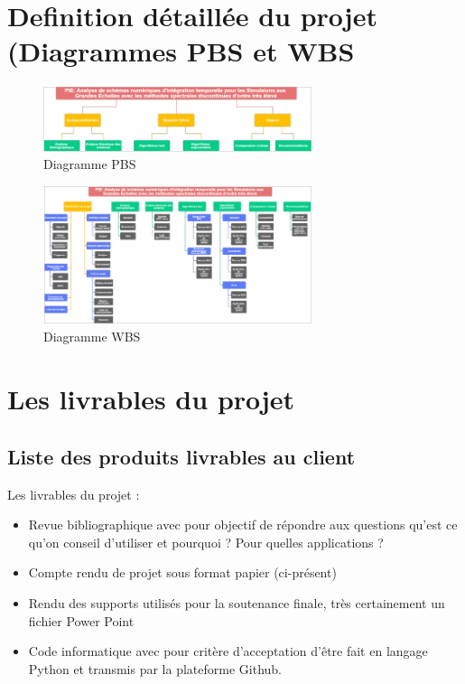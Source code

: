 \documentclass[a4paper,12pt]{report}
\theoremstyle{break}
\begin{document}
\chapter{Definition détaillée du projet (Diagrammes PBS et WBS}

\begin{figure}
     \centering
      \includegraphics[width=0.7\textwidth]{images/PBS.png}
       \caption{Diagramme PBS}
    \label{chaine optim}
\end{figure}
    
  \begin{figure}
     \centering
       \includegraphics[width=0.7\textwidth]{images/WBS.png}
       \caption{Diagramme WBS}
     \label{chaine optim}
  \end{figure}
    
\chapter{Les livrables du projet}
\section{Liste des produits livrables au client}
   Les livrables du projet :
   \begin{itemize}[label=\textbullet]
   	\item Revue bibliographique avec pour objectif de répondre aux questions qu’est ce qu’on conseil d’utiliser et pourquoi ? Pour quelles applications ?
   	\item Compte rendu de projet sous format papier (ci-présent)
   	\item Rendu des supports utilisés pour la soutenance finale, très certainement un fichier Power Point
   	\item  Code informatique avec pour critère d’acceptation d’être fait en langage Python et transmis par la plateforme Github.
    \end{itemize}
\end{document}
